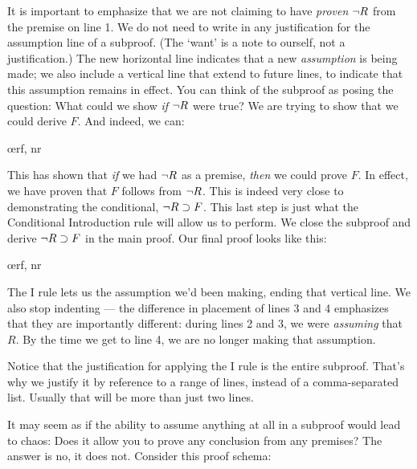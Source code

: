 \begin{ndproof}
	  
	\open
		 
		\have{}{}
	\close
\end{ndproof}

It is important to emphasize that we are not claiming to have \emph{proven} $\neg R$ from the premise on line 1. We do not need to write in any justification for the assumption line of a subproof. (The `want' is a note to ourself, not a justification.) The new horizontal line indicates that a new \emph{assumption} is being made; we also include a vertical line that extend to future lines, to indicate that this assumption remains in effect. You can think of the subproof as posing the question: What could we show \emph{if} $\neg R$ were true? We are trying to show that we could derive $F$. And indeed, we can:

\begin{ndproof}
	  
	\open
		 
		\oe{rf, nr}
	\close
\end{ndproof}

This has shown that \emph{if} we had $\neg R$ as a premise, \emph{then} we could prove $F$. In effect, we have proven that $F$ follows from $\neg R$. This is indeed very close to demonstrating the conditional, $\neg R \supset F$. This last step is just what the Conditional Introduction rule will allow us to perform. We close the subproof and derive $\neg R \supset F$ in the main proof. Our final proof looks like this:

\begin{ndproof}
	\open
		\oe{rf, nr}
	\close
\end{ndproof}

The {\eif}I rule lets us  the assumption we'd been making, ending that vertical line. We also stop indenting --- the difference in placement of lines 3 and 4 emphasizes that they are importantly different: during lines 2 and 3, we were \emph{assuming} that \enot $R$. By the time we get to line 4, we are no longer making that assumption.

Notice that the justification for applying the {\eif}I rule is the entire subproof. That's why we justify it by reference to a range of lines, instead of a comma-separated list. Usually that will be more than just two lines.

It may seem as if the ability to assume anything at all in a subproof would lead to chaos: Does it allow you to prove any conclusion from any premises? The answer is no, it does not. Consider this proof schema:

